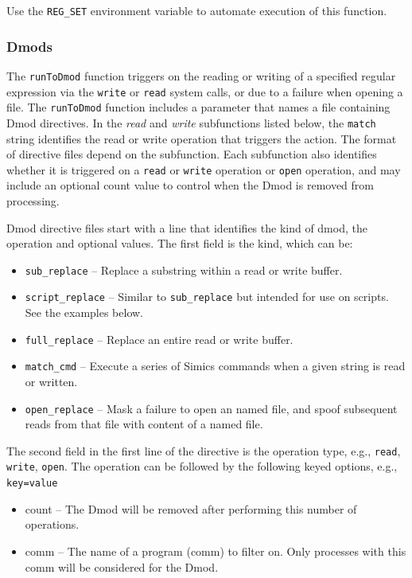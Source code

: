 \documentclass[titlepage]{article}
\begin{document}
Use the {\tt REG\_SET} environment variable to automate execution of this function.

\subsubsection{Dmods}
The {\tt runToDmod} function triggers on the reading or writing of a specified
regular expression via the {\tt write} or {\tt read} system calls, or due to a failure
when opening a file.    
The {\tt runToDmod} function includes a parameter that names a file containing
Dmod directives.  In the \textit{read} and \textit{write} subfunctions listed
below, the {\tt match} string identifies the read or write operation that triggers the action. 
The format of directive files depend on the subfunction.  Each subfunction also identifies whether it is
triggered on a {\tt read} or {\tt write} operation or {\tt open} operation, and may include an optional count value to control when
the Dmod is removed from processing.

Dmod directive files start with a line that identifies the kind of dmod, the operation and optional values.
The first field is the kind, which can be:
\begin {itemize}
\item {\tt sub\_replace} -- Replace a substring within a read or write buffer.
\item {\tt script\_replace} -- Similar to {\tt sub\_replace} but intended for use on scripts.  See the examples below.
\item {\tt full\_replace} -- Replace an entire read or write buffer.
\item {\tt match\_cmd} -- Execute a series of Simics commands when a given string is read or written.
\item {\tt open\_replace} -- Mask a failure to open an named file, and spoof subsequent reads from that file with content of a named file.
\end{itemize}
The second field in the first line of the directive is the operation type, e.g., {\tt read}, {\tt write}, {\tt open}.
The operation can be followed by the following keyed options, e.g., {\tt key=value}
\begin{itemize}
\item count -- The Dmod will be removed after performing this number of operations. 
\item comm -- The name of a program (comm) to filter on.  Only processes with this comm will be considered for the Dmod.
\end{itemize}
\end{document}
